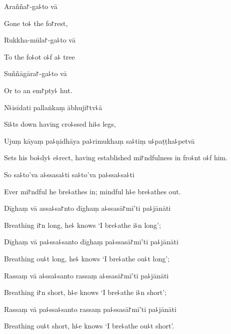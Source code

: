 Arañña꜓-ga꜕to vā

\begin{english}
  Gone to꜕ the fo꜓rest,
\end{english}

Rukkha-mūla꜓-ga꜕to vā

\begin{english}
  To the fo꜕ot o꜕f a꜕ tree
\end{english}

Suññāgāra꜓-ga꜕to vā

\begin{english}
  Or to an em꜓pty꜕ hut.
\end{english}

N꜕isīdati pallaṅkaṃ ābhuji꜓tv꜕ā

\begin{english}
  Si꜕ts down having cro꜕ssed hi꜕s legs,
\end{english}

Ujuṃ kāyaṃ pa꜕ṇidhāya pa꜕rimukhaṃ sa꜕tiṃ u꜕paṭṭha꜕petvā

\begin{english}
  Sets his bo꜕dy꜕ e꜕rect, having established mi꜓ndfulness in fro꜕nt o꜕f him.
\end{english}

So sa꜕to'va a꜕ssasa꜕ti sa꜕to'va pa꜕ssa꜕sa꜕ti

\begin{english}
  Ever mi꜓ndful he bre꜕athes in; mindful h꜕e bre꜕athes out.
\end{english}

Dīghaṃ vā assa꜕sa꜓nto dīghaṃ a꜕ssasā꜓mī'ti pa꜕jānāti

\begin{english}
  Breathing i꜓n long, he꜕ knows `I bre꜕athe i꜕n long';
\end{english}

Dīghaṃ vā pa꜕ssa꜕santo dīghaṃ pa꜕ssasā꜓mī'ti pa꜕jānāti

\begin{english}
  Breathing ou꜕t long, he꜕ knows `I bre꜕athe ou꜕t long';
\end{english}

Rassaṃ vā a꜕ssa꜕santo rassaṃ a꜕ssasā꜓mī'ti pa꜕jānāti

\begin{english}
  Breathing i꜓n short, h꜕e knows `I bre꜕athe i꜕n short';
\end{english}

Rassaṃ vā pa꜕ssa꜕santo rassaṃ pa꜕ssasā꜓mī'ti pa꜕jānāti

\begin{english}
  Breathing ou꜕t short, h꜕e knows `I bre꜕athe ou꜕t short'.
\end{english}

